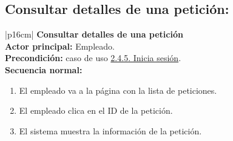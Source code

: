     \subsection{Consultar detalles de una petición:}
    \label{subsec:2.4.6.}
        \begin{longtable}{|p{16cm}|} 
        \hline
        \textbf{Consultar detalles de una petición} \\ \hline
        \textbf{Actor principal:} Empleado. \\ \hline
        \textbf{Precondición:} caso de uso \hyperref[subsec:2.4.5.]{2.4.5. Inicia sesión}. \\ \hline
        \textbf{Secuencia normal:} \\
        \begin{minipage}[t]{\linewidth}
            \begin{enumerate}
                \item El empleado va a la página con la lista de peticiones.
                \item El empleado clica en el ID de la petición.
                \item El sistema muestra la información de la petición.
            \end{enumerate}
            \vspace{1mm}
        \end{minipage} \\ \hline
        \caption{Descripción general del caso de uso - Consultar detalles de una petición.}
        \end{longtable}


